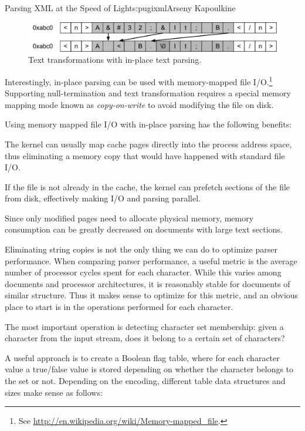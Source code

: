 \begin{aosachapter}{Parsing XML at the Speed of Light}{s:pugixml}{Arseny Kapoulkine}
\begin{figure}[htbp]
\centering
\includegraphics{pugixml-images/image04.png}
\caption{Text transformations with in-place text parsing.}
\end{figure}

Interestingly, in-place parsing can be used with memory-mapped file
I/O.\footnote{See \url{http://en.wikipedia.org/wiki/Memory-mapped_file}.}
Supporting null-termination and text transformation requires a special
memory mapping mode known as \emph{copy-on-write} to avoid modifying the
file on disk.

Using memory mapped file I/O with in-place parsing has the following
benefits:

\begin{aosaitemize}

\item
  The kernel can usually map cache pages directly into the process
  address space, thus eliminating a memory copy that would have happened
  with standard file I/O.
\item
  If the file is not already in the cache, the kernel can prefetch
  sections of the file from disk, effectively making I/O and parsing
  parallel.
\item
  Since only modified pages need to allocate physical memory, memory
  consumption can be greatly decreased on documents with large text
  sections.
\end{aosaitemize}


Eliminating string copies is not the only thing we can do to optimize
parser performance. When comparing parser performance, a useful metric
is the average number of processor cycles spent for each character.
While this varies among documents and processor architectures, it is
reasonably stable for documents of similar structure. Thus it makes
sense to optimize for this metric, and an obvious place to start is in
the operations performed for each character.

The most important operation is detecting character set membership:
given a character from the input stream, does it belong to a certain set
of characters?

A useful approach is to create a Boolean flag table, where for each
character value a true/false value is stored depending on whether the
character belongs to the set or not. Depending on the encoding,
different table data structures and sizes make sense as follows:


\end{aosachapter}
